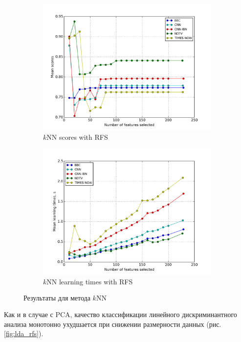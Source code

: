 \begin{figure}[h!]
    \centering
	\begin{subfigure}{0.45\textwidth}
		\includegraphics[width=\textwidth]{images/RFS-kNN.png}
		\caption{\(k\)NN scores with RFS}
	\end{subfigure}
	\begin{subfigure}{0.45\textwidth}
		\includegraphics[width=\textwidth]{images/RFS-kNNTime.png}
		\caption{\(k\)NN learning times with RFS}
	\end{subfigure}
	\caption{Результаты для метода \(k\)NN}\label{fig:knn_rfs}
\end{figure}

\par
Как и в случае с PCA, качество классификации линейного дискриминантного анализа монотонно ухудшается при снижении размерности данных (рис. \ref{fig:lda_rfs}).

